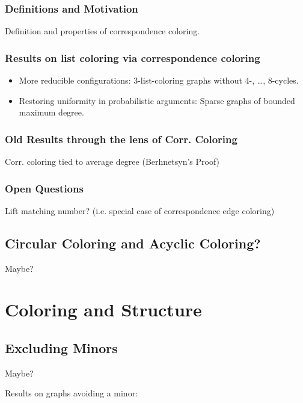 \documentclass[12pt,twoside,openright,a4paper]{book}
\begin{document}
\section{Definitions and Motivation}

Definition and properties of correspondence coloring.

\section{Results on list coloring via correspondence coloring}

\begin{itemize}
\item More reducible configurations: $3$-list-coloring graphs without $4$-, \ldots, $8$-cycles.
\item Restoring uniformity in probabilistic arguments: Sparse graphs of bounded maximum degree.
\end{itemize}

\section{Old Results through the lens of Corr. Coloring}

Corr. coloring tied to average degree (Berhnetsyn's Proof)

\section{Open Questions}

Lift matching number? (i.e. special case of correspondence edge coloring)

\chapter{Circular Coloring and Acyclic Coloring?}

Maybe?

\part{Coloring and Structure}

\chapter{Excluding Minors}

Maybe?

Results on graphs avoiding a minor:
\end{document}
